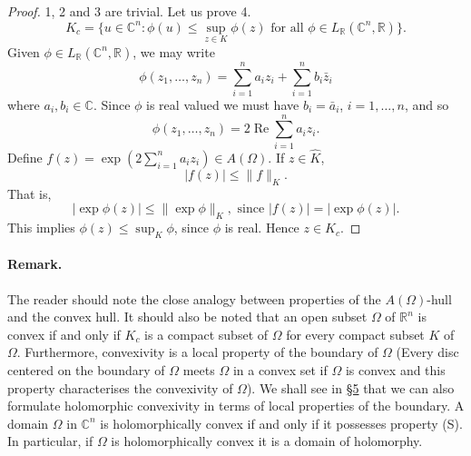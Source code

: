 \begin{proof}
1, 2 and 3 are trivial. Let us prove 4.
\[K_c=\{u\in\mathbb C^n:\phi(u)\leq\sup_{z\in K}\phi(z)\text{ for all }\phi\in L_{\mathbb R}(\mathbb C^n,\mathbb R)\}.\]
Given $\phi\in L_{\mathbb R}(\mathbb C^n,\mathbb R)$, we may write
\[\phi(z_1,\ldots,z_n)=\sum_{i=1}^n a_i z_i+\sum_{i=1}^n b_i\bar z_i\]
where $a_i,b_i\in\mathbb C$. Since $\phi$ is real valued we must have $b_i=\bar a_i$, $i=1,\ldots,n$, and so
\[\phi(z_1,\ldots,z_n)=2\operatorname{Re}\sum_{i=1}^n a_i z_i.\]
Define $f(z)=\exp(2\sum_{i=1}^n a_i z_i)\in A(\Omega)$. If $z\in\widehat K$,
\[|f(z)|\leq\|f\|_K.\]
That is,
\[|\exp\phi(z)|\leq\|\exp\phi\|_K,\text{ since }|f(z)|=|\exp\phi(z)|.\]
This implies $\phi(z)\leq\sup_K\phi$, since $\phi$ is real. Hence $z\in K_c$.
\end{proof}
\paragraph*{Remark.} The reader should note the close analogy between properties of the $A(\Omega)$-hull and the convex hull. It should also be noted that an open subset $\Omega$ of $\mathbb R^n$ is convex if and only if $K_c$ is a compact subset of $\Omega$ for every compact subset $K$ of $\Omega$. Furthermore, convexivity is a local property of the boundary of $\Omega$ (Every disc centered on the boundary of $\Omega$ meets $\Omega$ in a convex set if $\Omega$ is convex and this property characterises the convexivity of $\Omega$). We shall see in \hyperref[sec:2:5]{\S5} that we can also formulate holomorphic convexivity in terms of local properties of the boundary.
 A domain $\Omega$ in $\mathbb C^n$ is holomorphically convex if and only if it possesses property (S). In particular, if $\Omega$ is holomorphically convex it is a domain of holomorphy.
